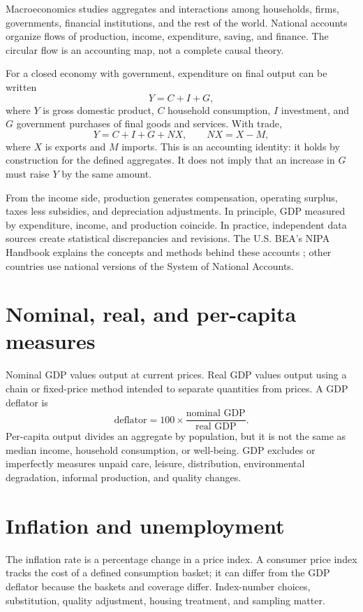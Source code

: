 \documentclass[11pt,oneside,openany]{book}
\begin{document}
Macroeconomics studies aggregates and interactions among households, firms, governments, financial institutions, and the rest of the world. National accounts organize flows of production, income, expenditure, saving, and finance. The circular flow is an accounting map, not a complete causal theory.

For a closed economy with government, expenditure on final output can be written
\[
  Y=C+I+G,
\]
where $Y$ is gross domestic product, $C$ household consumption, $I$ investment, and $G$ government purchases of final goods and services. With trade,
\[
  Y=C+I+G+NX,\qquad NX=X-M,
\]
where $X$ is exports and $M$ imports. This is an accounting identity: it holds by construction for the defined aggregates. It does not imply that an increase in $G$ must raise $Y$ by the same amount.

From the income side, production generates compensation, operating surplus, taxes less subsidies, and depreciation adjustments. In principle, GDP measured by expenditure, income, and production coincide. In practice, independent data sources create statistical discrepancies and revisions. The U.S. BEA's NIPA Handbook explains the concepts and methods behind these accounts \cite{bea2025}; other countries use national versions of the System of National Accounts.

\section{Nominal, real, and per-capita measures}

Nominal GDP values output at current prices. Real GDP values output using a chain or fixed-price method intended to separate quantities from prices. A GDP deflator is
\[
  \text{deflator}=100\times\frac{\text{nominal GDP}}{\text{real GDP}}.
\]
Per-capita output divides an aggregate by population, but it is not the same as median income, household consumption, or well-being. GDP excludes or imperfectly measures unpaid care, leisure, distribution, environmental degradation, informal production, and quality changes.

\section{Inflation and unemployment}

The inflation rate is a percentage change in a price index. A consumer price index tracks the cost of a defined consumption basket; it can differ from the GDP deflator because the baskets and coverage differ. Index-number choices, substitution, quality adjustment, housing treatment, and sampling matter.
\end{document}
